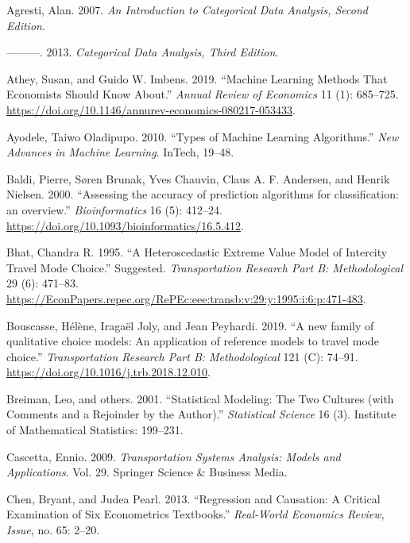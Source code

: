 \documentclass[11pt,]{article}
\begin{document}
\leavevmode\hypertarget{ref-agresti2007cd}{}%
Agresti, Alan. 2007. \emph{An Introduction to Categorical Data Analysis,
Second Edition}.

\leavevmode\hypertarget{ref-agresti2013cd}{}%
---------. 2013. \emph{Categorical Data Analysis, Third Edition}.

\leavevmode\hypertarget{ref-athey2019ml}{}%
Athey, Susan, and Guido W. Imbens. 2019. ``Machine Learning Methods That
Economists Should Know About.'' \emph{Annual Review of Economics} 11
(1): 685--725.
\url{https://doi.org/10.1146/annurev-economics-080217-053433}.

\leavevmode\hypertarget{ref-ayodele2010tml}{}%
Ayodele, Taiwo Oladipupo. 2010. ``Types of Machine Learning
Algorithms.'' \emph{New Advances in Machine Learning}. InTech, 19--48.

\leavevmode\hypertarget{ref-baldi2000ar}{}%
Baldi, Pierre, Søren Brunak, Yves Chauvin, Claus A. F. Andersen, and
Henrik Nielsen. 2000. ``Assessing the accuracy of prediction algorithms
for classification: an overview.'' \emph{Bioinformatics} 16 (5):
412--24. \url{https://doi.org/10.1093/bioinformatics/16.5.412}.

\leavevmode\hypertarget{ref-bhat1995evm}{}%
Bhat, Chandra R. 1995. ``A Heteroscedastic Extreme Value Model of
Intercity Travel Mode Choice.'' Suggested. \emph{Transportation Research
Part B: Methodological} 29 (6): 471--83.
\url{https://EconPapers.repec.org/RePEc:eee:transb:v:29:y:1995:i:6:p:471-483}.

\leavevmode\hypertarget{ref-joly2019qcm}{}%
Bouscasse, Hélène, Iragaël Joly, and Jean Peyhardi. 2019. ``A new family
of qualitative choice models: An application of reference models to
travel mode choice.'' \emph{Transportation Research Part B:
Methodological} 121 (C): 74--91.
\url{https://doi.org/10.1016/j.trb.2018.12.010}.

\leavevmode\hypertarget{ref-breiman2001stat}{}%
Breiman, Leo, and others. 2001. ``Statistical Modeling: The Two Cultures
(with Comments and a Rejoinder by the Author).'' \emph{Statistical
Science} 16 (3). Institute of Mathematical Statistics: 199--231.

\leavevmode\hypertarget{ref-cascetta2009tr}{}%
Cascetta, Ennio. 2009. \emph{Transportation Systems Analysis: Models and
Applications}. Vol. 29. Springer Science \& Business Media.

\leavevmode\hypertarget{ref-chen2013rac}{}%
Chen, Bryant, and Judea Pearl. 2013. ``Regression and Causation: A
Critical Examination of Six Econometrics Textbooks.'' \emph{Real-World
Economics Review, Issue}, no. 65: 2--20.
\end{document}
